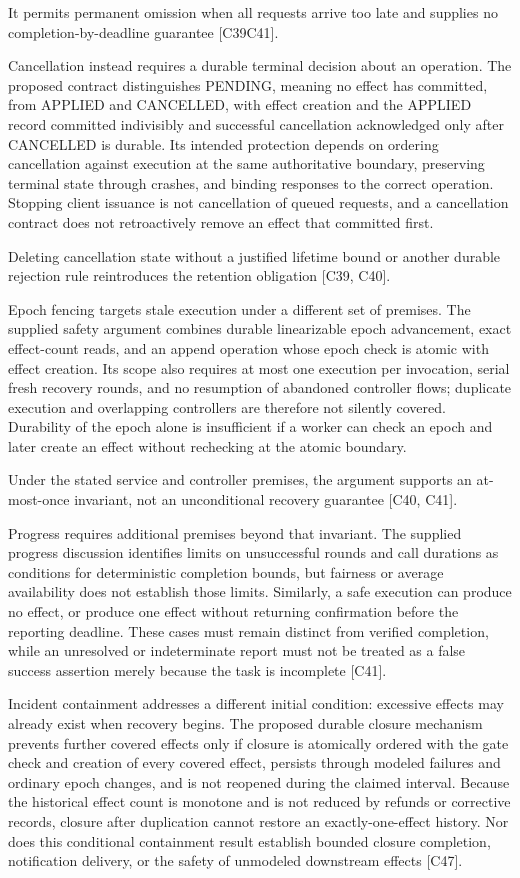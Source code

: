 \documentclass[11pt]{article}
\begin{document}
It permits permanent omission when all requests arrive too late and supplies no completion-by-deadline guarantee [C39\textendash{}C41].

Cancellation instead requires a durable terminal decision about an operation. The proposed contract distinguishes PENDING, meaning no effect has committed, from APPLIED and CANCELLED, with effect creation and the APPLIED record committed indivisibly and successful cancellation acknowledged only after CANCELLED is durable. Its intended protection depends on ordering cancellation against execution at the same authoritative boundary, preserving terminal state through crashes, and binding responses to the correct operation. Stopping client issuance is not cancellation of queued requests, and a cancellation contract does not retroactively remove an effect that committed first.

Deleting cancellation state without a justified lifetime bound or another durable rejection rule reintroduces the retention obligation [C39, C40].

Epoch fencing targets stale execution under a different set of premises. The supplied safety argument combines durable linearizable epoch advancement, exact effect-count reads, and an append operation whose epoch check is atomic with effect creation. Its scope also requires at most one execution per invocation, serial fresh recovery rounds, and no resumption of abandoned controller flows; duplicate execution and overlapping controllers are therefore not silently covered. Durability of the epoch alone is insufficient if a worker can check an epoch and later create an effect without rechecking at the atomic boundary.

Under the stated service and controller premises, the argument supports an at-most-once invariant, not an unconditional recovery guarantee [C40, C41].

Progress requires additional premises beyond that invariant. The supplied progress discussion identifies limits on unsuccessful rounds and call durations as conditions for deterministic completion bounds, but fairness or average availability does not establish those limits. Similarly, a safe execution can produce no effect, or produce one effect without returning confirmation before the reporting deadline. These cases must remain distinct from verified completion, while an unresolved or indeterminate report must not be treated as a false success assertion merely because the task is incomplete [C41].

Incident containment addresses a different initial condition: excessive effects may already exist when recovery begins. The proposed durable closure mechanism prevents further covered effects only if closure is atomically ordered with the gate check and creation of every covered effect, persists through modeled failures and ordinary epoch changes, and is not reopened during the claimed interval. Because the historical effect count is monotone and is not reduced by refunds or corrective records, closure after duplication cannot restore an exactly-one-effect history. Nor does this conditional containment result establish bounded closure completion, notification delivery, or the safety of unmodeled downstream effects [C47].
\end{document}
